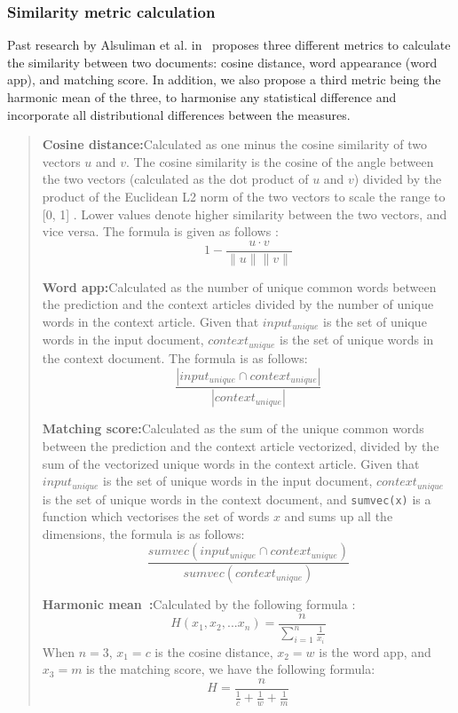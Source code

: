 \documentclass{article}
\begin{document}
\subsubsection{Similarity metric calculation} \label{section:similarity-metric}

Past research by Alsuliman et al. in~\cite{alsuliman2022social} proposes three different metrics to calculate the similarity between two documents: cosine distance, word appearance (word app), and matching score. In addition, we also propose a third metric being the harmonic mean of the three, to harmonise any statistical difference and incorporate all distributional differences between the measures.

\begin{quote}
  \textbf{Cosine distance:}\quad Calculated as one minus the cosine similarity of two vectors $u$ and $v$. The cosine similarity is the cosine of the angle between the two vectors (calculated as the dot product of $u$ and $v$) divided by the product of the Euclidean L2 norm of the two vectors to scale the range to [0, 1] \cite{scikit-learn}. Lower values denote higher similarity between the two vectors, and vice versa. The formula is given as follows \cite{scipy}:
  \[ 1 - \frac{u \cdot v}{\lVert u \rVert \lVert v \rVert}\]

  \textbf{Word app:}\quad Calculated as the number of unique common words between the prediction and the context articles divided by the number of unique words in the context article. Given that \texttt{$input_{unique}$} is the set of unique words in the input document, \texttt{$context_{unique}$} is the set of unique words in the context document. The formula is as follows:
  \[\frac{\left|input_{unique} \cap context_{unique}\right|}{\left|context_{unique}\right|}\]

  \textbf{Matching score:}\quad Calculated as the sum of the unique common words between the prediction and the context article vectorized, divided by the sum of the vectorized unique words in the context article. Given that \texttt{$input_{unique}$} is the set of unique words in the input document, \texttt{$context_{unique}$} is the set of unique words in the context document, and \texttt{sumvec(x)} is a function which vectorises the set of words $x$ and sums up all the dimensions, the formula is as follows:
  \[\frac{sumvec(input_{unique} \cap context_{unique})}{sumvec(context_{unique})}\]

  \textbf{Harmonic mean~\cite{harmonic_mean}:}\quad Calculated by the following formula :
  \[H(x_1, x_2, ... x_n) = \frac{n}{\sum^n_{i=1}\frac{1}{x_i}}\]
  When $n = 3$, $x_1 = c$ is the cosine distance, $x_2 = w$ is the word app, and $x_3 = m$ is the matching score, we have the following formula:
  \[H = \frac{n}{\frac{1}{c} + \frac{1}{w} + \frac{1}{m}}\]
\end{quote}
\end{document}
